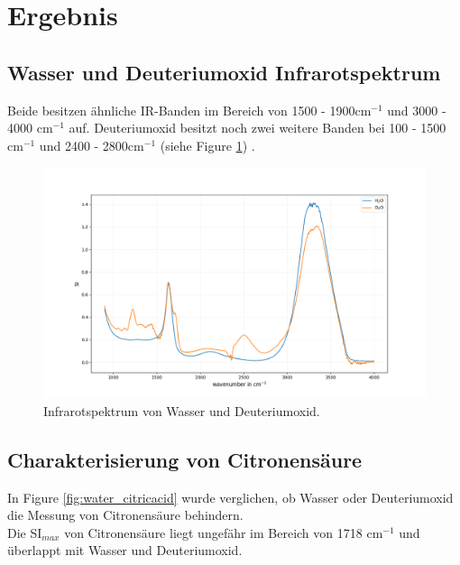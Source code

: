 \documentclass[10pt,a4paper]{article}
\begin{document}
	
	
	\section{Ergebnis}
		\subsection{Wasser und Deuteriumoxid Infrarotspektrum}

			Beide besitzen ähnliche IR-Banden im Bereich von 1500 - 1900cm$^{-1}$ und 3000 - 4000  cm$^{-1}$  auf. Deuteriumoxid besitzt noch zwei weitere Banden bei 100 - 1500 cm$^{-1}$ und 2400 - 2800cm$^{-1}$ (siehe Figure \ref{fig:water}) .
		
			\begin{figure}[H]
				\centering
				\includegraphics[scale=0.55]{Onlywater.png}
				\caption{Infrarotspektrum von Wasser und Deuteriumoxid.}
				\label{fig:water}
			\end{figure}
		
	
		\subsection{Charakterisierung von Citronensäure}
			In Figure \ref{fig:water_citricacid} wurde verglichen, ob Wasser oder Deuteriumoxid die Messung von Citronensäure behindern.\\
			Die SI$_{max}$ von Citronensäure liegt ungefähr im Bereich von 1718 cm$^{-1}$ und überlappt mit Wasser und Deuteriumoxid.\\
		
\end{document}

